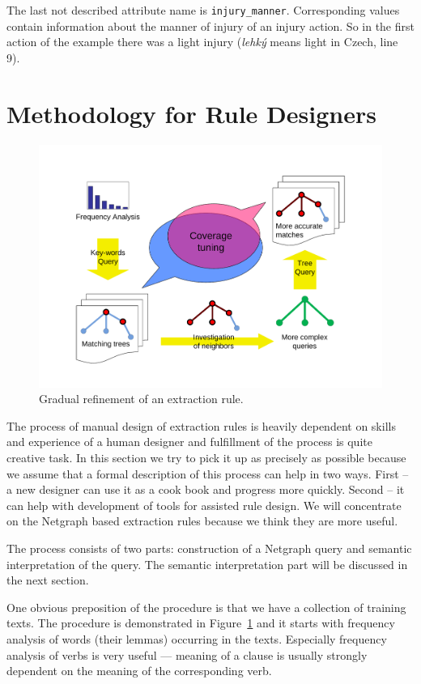 The last not described attribute name is \verb+injury_manner+. Corresponding values contain information about the manner of injury of an injury action. So in the first action of the example there was a light injury (\emph{lehký} means light in Czech, line 9).




\section{Methodology for Rule Designers} \label{sec:ch50_rules_design}

\begin{figure}
	\centering
		\includegraphics[angle=-90, width=0.5\hsize]{coverge_tuning}
	\caption{Gradual refinement of an extraction rule.}
	\label{fig:ch50_coverge_tuning}
\end{figure}


The process of manual design of extraction rules is heavily dependent on skills and experience of a human designer and fulfillment of the process is quite creative task. In this section we try to pick it up as precisely as possible because we assume that a formal description of this process can help in two ways. First -- a new designer can use it as a cook book and progress more quickly. Second -- it can help with development of tools for assisted rule design. We will concentrate on the Netgraph based extraction rules because we think they are more useful.

The process consists of two parts: construction of a Netgraph query and semantic interpretation of the query. The semantic interpretation part will be discussed in the next section.

One obvious preposition of the procedure is that we have a collection of training texts.
The procedure is demonstrated in Figure~\ref{fig:ch50_coverge_tuning} and it starts with frequency analysis of words (their lemmas) occurring in the texts. Especially frequency analysis of verbs is very useful --- meaning of a clause is usually strongly dependent on the meaning of the corresponding verb.

